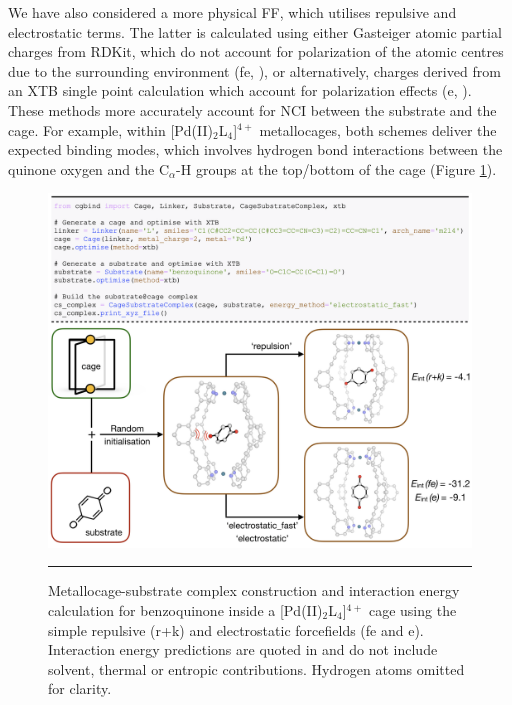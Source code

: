\documentclass[../../main.tex]{subfiles}
\begin{document}
We have also considered a more physical FF, which utilises repulsive and electrostatic terms. The latter is calculated using either Gasteiger atomic partial charges from RDKit, which do not account for polarization of the atomic centres due to the surrounding environment (fe, ), or alternatively, charges derived from an XTB single point calculation which account for polarization effects (e, ). These methods more accurately account for NCI between the substrate and the cage. For example, within [Pd(II)$_2$L$_4$]$^{4+}$ metallocages, both schemes deliver the expected binding modes, which involves hydrogen bond interactions between the quinone oxygen and the C$_\alpha$-H groups at the top/bottom of the cage (Figure \ref{fig::cg_5}). 


\begin{figure}[h!]
	\vspace{0.4cm}
	\centering
	\includegraphics[width=\textwidth]{3/cgbind/figs/fig5}
	\vspace{0.2cm}
	\hrule
	\caption{Metallocage-substrate complex construction and interaction energy calculation for benzoquinone inside a [Pd(II)$_2$L$_4$]$^{4+}$ cage using the simple repulsive (r+k) and electrostatic forcefields (fe and e). Interaction energy predictions are quoted in \kcalx and do not include solvent, thermal or entropic contributions. Hydrogen atoms omitted for clarity.}
	\label{fig::cg_5}
\end{figure}
\end{document}

